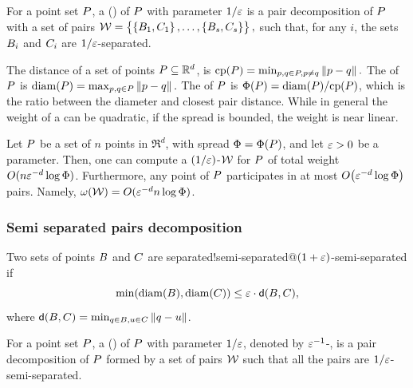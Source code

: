 \documentclass[12pt]{article}%
\begin{document}
\begin{defn}
    For a point set $P$, a  (\emphOnly{\WSPD{}}) of $P$ with parameter
    $1/\varepsilon$ is a pair decomposition of $P$ with a set of pairs
    \begin{math}
        \mathcal{W} = \left\{ {\bigl.
           \left\{ {B_1,C_1} \right\},\ldots,\left\{ {B_s,C_s} \right\}} \right\},
    \end{math}
    such that, for any $i$, the sets $B_i$ and $C_i$ are
    $1/\varepsilon$-separated.
\end{defn}


The  distance of a set of points
$P \subseteq \mathbb{R}^d$, is
\begin{math}
    \cpX{\PS} = \min_{\pa, \pb \in \PS, \pa \neq \pb} \dY{\pa}{\pb}.
\end{math}
The  of $P$ is
\begin{math}
    \diamX{\PS} = \max_{\pa, \pb \in \PS} \dY{\pa}{\pb}.
\end{math}
The  of $P$ is
$\spreadX{\PS} = \diamX{\PS} / \cpX{\PS}$, which is the ratio between
the diameter and closest pair distance.  While in general the weight
of a \WSPD can be quadratic, if the spread is bounded, the weight is
near linear.

\begin{lemma}
    Let $P$ be a set of $n$ points in $\Re^d$, with spread
    $\spread = \spreadX{\PS}$, and let $\varepsilon > 0$ be a
    parameter. Then, one can compute a $(1/\varepsilon)$-\WSPD $\mathcal{W}$ for
    $P$ of total weight $O(n \varepsilon^{-d} \log \Phi)$. Furthermore,
    any point of $P$ participates in at most
    $O\pth{ \eps^{-d} \log \spread}$ pairs. Namely,
    $\WeightX{\WS} = O( \eps^{-d} n \log \spread )$.
\end{lemma}

\subsubsection{Semi separated pairs decomposition}

\begin{defn}%
    Two sets of points $B$ and $C$ are
    {separated!semi-separated@$(1+\varepsilon)$-semi-separated} if
    \begin{equation*}
        \min \pth{ \diameterX{\PSB}, \diameterX{\PSC} } \leq \eps \cdot
        \dsY{\PSB}{\PSC},%
    \end{equation*}
    where
    $\dsY{ \PSB}{\PSC} = \min_{\pb \in \PSB, \pc \in \PSC}
    \dY{\pb}{\pc}$.

    For a point set $P$, a  (\emphOnly{\SSPD{}}) of $P$ with parameter
    $1/\varepsilon$, denoted by $\varepsilon^{-1}$-\SSPD, is a pair decomposition of
    $P$ formed by a set of pairs $\mathcal{W}$ such that all the pairs are
    $1/\varepsilon$-semi-separated.
\end{defn}
\end{document}
